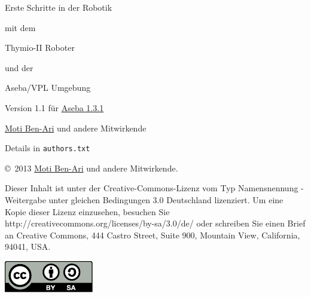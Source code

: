 \thispagestyle{empty}

\begin{center}
\begin{LARGE}
\begin{bfseries}
Erste Schritte in der Robotik

mit dem 

Thymio-II Roboter

und der 

Aseba/VPL Umgebung
\end{bfseries}
\end{LARGE}

\begin{Large}
Version 1.1 für \href{https://aseba.wikidot.com/de:downloadinstall}{Aseba 1.3.1}
\end{Large}

\bigskip\bigskip

\begin{LARGE}
\href{http://www.weizmann.ac.il/sci-tea/benari/}{Moti Ben-Ari} und andere Mitwirkende\\
\end{LARGE}
\bigskip
\begin{Large}
Details in \texttt{authors.txt} 
\end{Large}

\bigskip


\end{center}

\vfill

\begin{center}
\copyright{}\  2013 \href{http://www.weizmann.ac.il/sci-tea/benari/}{Moti Ben-Ari} und andere Mitwirkende.
\end{center}

Dieser Inhalt ist unter der Creative-Commons-Lizenz vom Typ Namensnennung -
Weitergabe unter gleichen Bedingungen 3.0 Deutschland lizenziert. Um eine Kopie
dieser Lizenz einzusehen, besuchen Sie
http://creativecommons.org/licenses/by-sa/3.0/de/ oder schreiben Sie einen
Brief an Creative Commons, 444 Castro Street, Suite 900, Mountain View,
California, 94041, USA.

\begin{center}
\includegraphics[width=.2\textwidth]{../images/by-sa}
\end{center}

\tableofcontents
\thispagestyle{empty}

